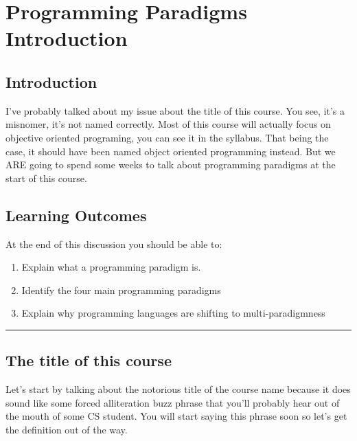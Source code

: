 \chapter{Programming Paradigms
Introduction}\label{programming-paradigms-introduction.md__programming-paradigms-introduction}

\section{Introduction}\label{programming-paradigms-introduction.md__introduction}

I've probably talked about my issue about the title of this course. You
see, it's a misnomer, it's not named correctly. Most of this course will
actually focus on objective oriented programing, you can see it in the
syllabus. That being the case, it should have been named object oriented
programming instead. But we ARE going to spend some weeks to talk about
programming paradigms at the start of this course.

\section{Learning
Outcomes}\label{programming-paradigms-introduction.md__learning-outcomes}

At the end of this discussion you should be able to:

\begin{enumerate}
\def\labelenumi{\arabic{enumi}.}
\tightlist
\item
  Explain what a programming paradigm is.
\item
  Identify the four main programming paradigms
\item
  Explain why programming languages are shifting to multi-paradigmness
\end{enumerate}

\begin{center}\rule{0.5\linewidth}{0.5pt}\end{center}

\section{The title of this
course}\label{programming-paradigms-introduction.md__the-title-of-this-course}

Let's start by talking about the notorious title of the course name
because it does sound like some forced alliteration buzz phrase that
you'll probably hear out of the mouth of some CS student. You will start
saying this phrase soon so let's get the definition out of the way.

